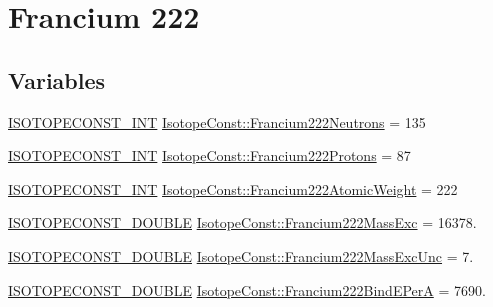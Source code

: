 \hypertarget{group___isotope_const-_francium-_fr222}{}\section{Francium 222}
\label{group___isotope_const-_francium-_fr222}
\subsection*{Variables}
\begin{DoxyCompactItemize}
\item 
\mbox{\hyperlink{group___isotope_const-_macros_ga5f18360b3e99483a35c32d789e62621c}{I\+S\+O\+T\+O\+P\+E\+C\+O\+N\+S\+T\+\_\+\+I\+NT}} \mbox{\hyperlink{group___isotope_const-_francium-_fr222_gad498567ced16d84c9e333f971a70a276}{Isotope\+Const\+::\+Francium222\+Neutrons}} = 135
\item 
\mbox{\hyperlink{group___isotope_const-_macros_ga5f18360b3e99483a35c32d789e62621c}{I\+S\+O\+T\+O\+P\+E\+C\+O\+N\+S\+T\+\_\+\+I\+NT}} \mbox{\hyperlink{group___isotope_const-_francium-_fr222_ga8ca3941a869904d7593249fd9c12a69a}{Isotope\+Const\+::\+Francium222\+Protons}} = 87
\item 
\mbox{\hyperlink{group___isotope_const-_macros_ga5f18360b3e99483a35c32d789e62621c}{I\+S\+O\+T\+O\+P\+E\+C\+O\+N\+S\+T\+\_\+\+I\+NT}} \mbox{\hyperlink{group___isotope_const-_francium-_fr222_gab172e070f3cbbb882350f44964c90c92}{Isotope\+Const\+::\+Francium222\+Atomic\+Weight}} = 222
\item 
\mbox{\hyperlink{group___isotope_const-_macros_ga8f45a7272ce02c0b4c65c44636ed719a}{I\+S\+O\+T\+O\+P\+E\+C\+O\+N\+S\+T\+\_\+\+D\+O\+U\+B\+LE}} \mbox{\hyperlink{group___isotope_const-_francium-_fr222_gaef461265a4898da1ec916a091ed886e8}{Isotope\+Const\+::\+Francium222\+Mass\+Exc}} = 16378.
\item 
\mbox{\hyperlink{group___isotope_const-_macros_ga8f45a7272ce02c0b4c65c44636ed719a}{I\+S\+O\+T\+O\+P\+E\+C\+O\+N\+S\+T\+\_\+\+D\+O\+U\+B\+LE}} \mbox{\hyperlink{group___isotope_const-_francium-_fr222_ga5b91af809306c12d18a7200fc0ce0e63}{Isotope\+Const\+::\+Francium222\+Mass\+Exc\+Unc}} = 7.
\item 
\mbox{\hyperlink{group___isotope_const-_macros_ga8f45a7272ce02c0b4c65c44636ed719a}{I\+S\+O\+T\+O\+P\+E\+C\+O\+N\+S\+T\+\_\+\+D\+O\+U\+B\+LE}} \mbox{\hyperlink{group___isotope_const-_francium-_fr222_ga6f46f56e404d5788c97303c8d4b85851}{Isotope\+Const\+::\+Francium222\+Bind\+E\+PerA}} = 7690.
\item 

\end{DoxyCompactItemize}
